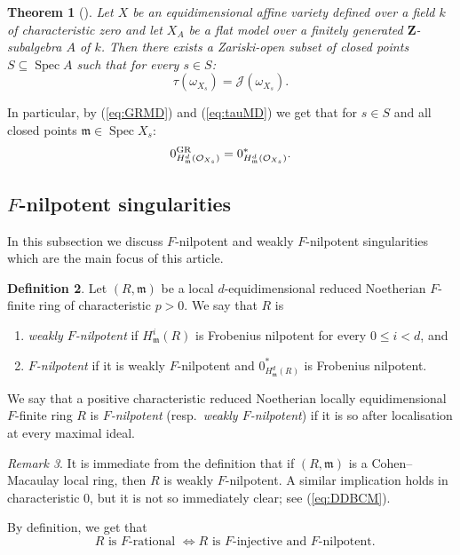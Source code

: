 \documentclass[letterpaper,11pt]{amsart}
\theoremstyle{plain}
\newtheorem{thm}{Theorem}[section]
\theoremstyle{definition}
\newtheorem{defi}[thm]{Definition}
\theoremstyle{remark}
\newtheorem{rmk}[thm]{Remark}
\def\Z{{\mathbf Z}}
\def\cO{\mathcal{O}}
\def\J{\mathcal{J}}
\def\frm{\mathfrak{m}}
\def\m{\mathfrak{m}} %
\DeclareMathOperator{\Spec} {Spec}
\begin{document}
\begin{thm}[{\cites{Smith00,Hara05}}] \label{thm:taureduction}
Let $X$ be an equidimensional affine variety defined over a field $k$ of characteristic zero and let $X_A$ be a flat model over a finitely generated $\Z$-subalgebra $A$ of $k$. Then there exists a Zariski-open subset of closed points $S \subseteq \Spec A$ such that for every $s \in S$:
\[
\tau(\omega_{X_s}) = \J(\omega_{X_s}).
\]
\end{thm}
In particular, by (\ref{eq:GRMD}) and (\ref{eq:tauMD})  we get that for $s \in S$ and all closed points $\m \in \Spec X_s$:
\begin{equation} \label{eq:0FstarEqualRed}
0^{\rm GR}_{H^d_\m(\cO_{X_s})} = 0^*_{H^d_\m(\cO_{X_s})}. 
\end{equation}


\subsection{$F$-nilpotent singularities} \label{ss:Fnilp}
In this subsection we discuss $F$-nilpotent and weakly $F$-nilpotent singularities which are the main focus of this article. 
\begin{defi} \label{defi:Fnilp} Let $(R,\frm)$ be a local $d$-equidimensional reduced Noetherian $F$-finite ring of characteristic $p>0$. We say that $R$ is 
\begin{enumerate}
    \item \emph{weakly $F$-nilpotent} if  $H^i_\frm(R)$ is Frobenius nilpotent for every $0 \leq i < d$, and 
    \item \emph{$F$-nilpotent} if it is weakly $F$-nilpotent and $0^*_{H^d_\m(R)}$ is Frobenius nilpotent.
\end{enumerate}
We say that a positive characteristic reduced Noetherian locally equidimensional $F$-finite ring $R$ is \emph{$F$-nilpotent} (resp.\ \emph{weakly $F$-nilpotent}) if it is so after localisation at every maximal ideal.
\end{defi}

\begin{rmk} \label{rmk-PerfCM} It is immediate from the definition that if $(R,\frm)$ is a Cohen--Macaulay local ring, then $R$ is weakly $F$-nilpotent. A similar implication holds in characteristic $0$, but it is not so immediately clear; see (\ref{eq:DDBCM}).    
\end{rmk}



By definition, we get that
\[
\text{ $R$ is $F$-rational } \iff \text{$R$ is $F$-injective and $F$-nilpotent.}
\]
\end{document}
